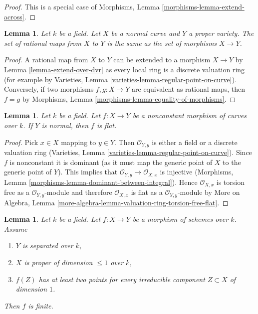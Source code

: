 \documentclass{stacks-project}
\theoremstyle{plain}
\newtheorem{lemma}[subsection]{Lemma}
\theoremstyle{definition}
\theoremstyle{remark}
\numberwithin{equation}{subsection}
\begin{document}
\begin{proof}
This is a special case of
Morphisms, Lemma \ref{morphisms-lemma-extend-across}.
\end{proof}

\begin{lemma}
\label{lemma-extend-over-normal-curve}
Let $k$ be a field. Let $X$ be a normal curve and $Y$ a proper variety.
The set of rational maps from $X$ to $Y$ is the same as the set
of morphisms $X \to Y$.
\end{lemma}

\begin{proof}
A rational map from $X$ to $Y$ can be extended to a morphism $X \to Y$
by Lemma \ref{lemma-extend-over-dvr}
as every local ring is a discrete valuation ring
(for example by Varieties, Lemma \ref{varieties-lemma-regular-point-on-curve}).
Conversely, if two morphisms $f,g: X \to Y$ are equivalent as rational maps,
then  $f = g$ by Morphisms, Lemma \ref{morphisms-lemma-equality-of-morphisms}.
\end{proof}

\begin{lemma}
\label{lemma-flat}
Let $k$ be a field. Let $f : X \to Y$ be a nonconstant morphism
of curves over $k$. If $Y$ is normal, then $f$ is flat.
\end{lemma}

\begin{proof}
Pick $x \in X$ mapping to $y \in Y$. Then $\mathcal{O}_{Y, y}$ is either a
field or a discrete valuation ring
(Varieties, Lemma \ref{varieties-lemma-regular-point-on-curve}).
Since $f$ is nonconstant it is dominant (as it must map the
generic point of $X$ to the generic point of $Y$). This implies that
$\mathcal{O}_{Y, y} \to \mathcal{O}_{X, x}$ is injective
(Morphisms, Lemma \ref{morphisms-lemma-dominant-between-integral}).
Hence $\mathcal{O}_{X, x}$ is torsion free as a $\mathcal{O}_{Y, y}$-module
and therefore $\mathcal{O}_{X, x}$ is flat as a $\mathcal{O}_{Y, y}$-module
by More on Algebra, Lemma
\ref{more-algebra-lemma-valuation-ring-torsion-free-flat}.
\end{proof}

\begin{lemma}
\label{lemma-finite}
Let $k$ be a field. Let $f : X \to Y$ be a morphism of
schemes over $k$. Assume
\begin{enumerate}
\item $Y$ is separated over $k$,
\item $X$ is proper of dimension $\leq 1$ over $k$,
\item $f(Z)$ has at least two points for every irreducible
component $Z \subset X$ of dimension $1$.
\end{enumerate}
Then $f$ is finite.
\end{lemma}
\end{document}
